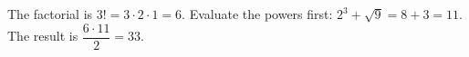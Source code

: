 The factorial is $3!=3\cdot2\cdot1=6$. Evaluate the powers first: $2^3+\sqrt9=8+3=11$. The result is $\dfrac{6\cdot11}{2}=\boxed{33}$.

